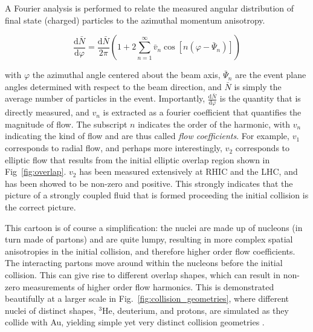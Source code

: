 A Fourier analysis is performed to relate the measured angular distribution of final state (charged) particles to the azimuthal momentum anisotropy. 

  \begin{equation}
    \frac{\mathrm{d}\bar{N}}{\mathrm{d}\varphi} = \frac{\mathrm{d}\bar{N}}{2\pi} \left(1 + 2\sum^\infty_{n=1}\bar{v}_n\cos[n(\varphi - \bar\Psi_n)]\right)
  \end{equation}

with $\varphi$ the azimuthal angle centered about the beam axis, $\bar\Psi_n$ are the event plane angles determined with respect to the beam direction, and $\bar{N}$ is simply the average number of particles in the event. Importantly, $\frac{\mathrm{d}\bar{N}}{\mathrm{d}\varphi}$ is the quantity that is directly measured, and $v_n$ is extracted as a fourier coefficient that quantifies the magnitude of flow. The subscript $n$ indicates the order of the harmonic, with $v_n$ indicating the kind of flow and are thus called \textit{flow coefficients}. For example, $v_1$ corresponds to radial flow, and perhaps more interestingly, $v_2$ corresponds to elliptic flow that results from the initial elliptic overlap region shown in Fig~\ref{fig:overlap}. $v_2$ has been measured extensively at RHIC and the LHC, and has been showed to be non-zero and positive. This strongly indicates that the picture of a strongly coupled fluid that is formed proceeding the initial collision is the correct picture.  

  
  This cartoon is of course a simplification: the nuclei are made up of nucleons (in turn made of partons) and are quite lumpy, resulting in more complex spatial anisotropies in the initial collision, and therefore higher order flow coefficients. The interacting partons move around within the nucleons before the initial collision. This can give rise to different overlap shapes, which can result in non-zero measurements of higher order flow harmonics. This is demonstrated beautifully at a larger scale in Fig.~\ref{fig:collision_geometries}, where different nuclei of distinct shapes, $^3$He, deuterium, and protons, are simulated as they collide with Au, yielding simple yet very distinct collision geometries \cite{Aidala2019}. 

